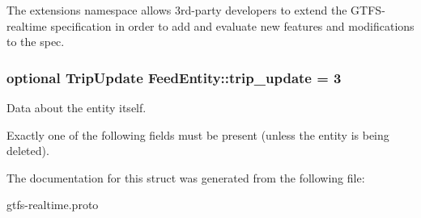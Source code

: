 The extensions namespace allows 3rd-\/party developers to extend the G\+T\+F\+S-\/realtime specification in order to add and evaluate new features and modifications to the spec. 

\subsubsection[{\texorpdfstring{trip\+\_\+update}{trip_update}}]{\setlength{\rightskip}{0pt plus 5cm}optional {\bf Trip\+Update} Feed\+Entity\+::trip\+\_\+update = 3}\hypertarget{structFeedEntity_a0951149769058b1b3a93ef41a5faa96a}{}\label{structFeedEntity_a0951149769058b1b3a93ef41a5faa96a}


Data about the entity itself. 

Exactly one of the following fields must be present (unless the entity is being deleted). 

The documentation for this struct was generated from the following file\+:\begin{DoxyCompactItemize}
\item 
gtfs-\/realtime.\+proto\end{DoxyCompactItemize}
